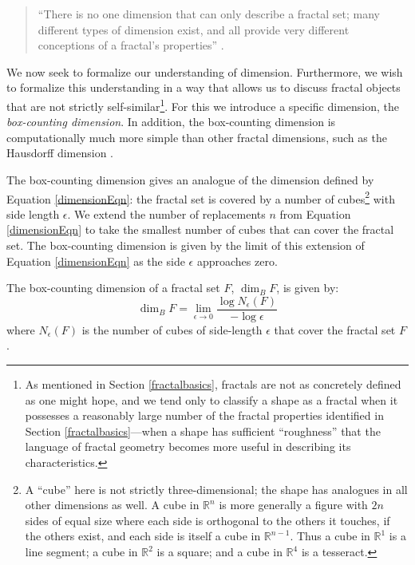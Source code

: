 \begin{quote}
``There is no one dimension that can only describe a fractal set; many different types of dimension exist, and all provide very different conceptions of a fractal's properties'' \citep{fractaltextbook}.
\end{quote}

We now seek to formalize our understanding of dimension. Furthermore, we wish to formalize this understanding in a way that allows us to discuss fractal objects that are not strictly self-similar\footnote{As mentioned in Section \ref{fractalbasics}, fractals are not as concretely defined as one might hope, and we tend only to classify a shape as a fractal when it possesses a reasonably large number of the fractal properties identified in Section \ref{fractalbasics}---when a shape has sufficient ``roughness'' that the language of fractal geometry becomes more useful in describing its characteristics.}. For this we introduce a specific dimension, the \textit{box-counting dimension}. In addition, the box-counting dimension is computationally much more simple than other fractal dimensions, such as the Hausdorff dimension \citep{fractaltextbook}.

The box-counting dimension gives an analogue of the dimension defined by Equation \ref{dimensionEqn}: the fractal set is covered by a number of cubes\footnote{A ``cube'' here is not strictly three-dimensional; the shape has analogues in all other dimensions as well. A cube in $\mathbb{R}^n$ is more generally a figure with $2n$ sides of equal size where each side is orthogonal to the others it touches, if the others exist, and each side is itself a cube in $\mathbb{R}^{n-1}$. Thus a cube in $\mathbb{R}^1$ is a line segment; a cube in $\mathbb{R}^2$ is a square; and a cube in $\mathbb{R}^4$ is a tesseract.} with side length $\epsilon$. We extend the number of replacements $ n $ from Equation \ref{dimensionEqn} to take the smallest number of cubes that can cover the fractal set. The box-counting dimension is given by the limit of this extension of Equation \ref{dimensionEqn} as the side $\epsilon$ approaches zero.

\begin{mydef} The box-counting dimension of a fractal set $ F $, $\operatorname{dim}_B F $, is given by:
\begin{equation}\operatorname{dim}_B F = \lim_{\epsilon \to 0} \frac{\log N_\epsilon(F)}{-\log\epsilon}
\end{equation}
where $N_\epsilon(F)$ is the number of cubes of side-length $\epsilon$ that cover the fractal set $F$.
\end{mydef}

